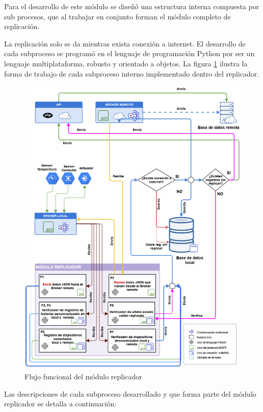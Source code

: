 Para el desarrollo de este módulo se diseñó una estructura interna compuesta por sub procesos, que al trabajar en conjunto forman el módulo completo de replicación.

La replicación solo se da mientras exista conexión a internet. El desarrollo de cada subproceso se programó en el lenguaje de programación Python por ser un lenguaje multiplataforma, robusto y orientado a objetos. La figura \ref{fig:flujoreplicador} ilustra la forma de trabajo de cada subproceso interno implementado dentro del replicador.


\begin{figure}[htpb]
\centering 
\includegraphics[width=1.15\textwidth]{./Figures/replicador.png}
\caption{Flujo funcional del módulo replicador}
\label{fig:flujoreplicador}
\end{figure}


Las descripciones de cada subproceso desarrollado y que forma parte del módulo replicador se detalla a continuación: 

